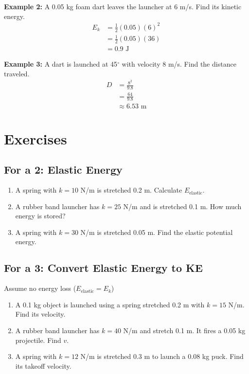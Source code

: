 \documentclass{article}
\begin{document}
\textbf{Example 2:}  
A 0.05 kg foam dart leaves the launcher at 6 m/s.  
Find its kinetic energy.
\begin{align*}
    E_k &= \frac{1}{2}(0.05)(6)^2 \\
        &= \frac{1}{2}(0.05)(36) \\
        &= 0.9 \text{ J}
\end{align*}

\textbf{Example 3:}  
A dart is launched at 45$^\circ$ with velocity 8 m/s.  
Find the distance traveled.
\begin{align*}
    D &= \frac{8^2}{9.8} \\
      &= \frac{64}{9.8} \\
      &\approx 6.53 \text{ m}
\end{align*}

\section{Exercises}

\subsection{For a 2: Elastic Energy}
\begin{enumerate}
    \item A spring with $k = 10$ N/m is stretched 0.2 m. Calculate $E_{\text{elastic}}$.
    \item A rubber band launcher has $k = 25$ N/m and is stretched 0.1 m. How much energy is stored?
    \item A spring with $k = 30$ N/m is stretched 0.05 m. Find the elastic potential energy.
\end{enumerate}

\subsection{For a 3: Convert Elastic Energy to KE}
Assume no energy loss ($E_{\text{elastic}} = E_k$)
\begin{enumerate}
    \item A 0.1 kg object is launched using a spring stretched 0.2 m with $k = 15$ N/m. Find its velocity.
    \item A rubber band launcher has $k = 40$ N/m and stretch 0.1 m. It fires a 0.05 kg projectile. Find $v$.
    \item A spring with $k = 12$ N/m is stretched 0.3 m to launch a 0.08 kg puck. Find its takeoff velocity.
\end{enumerate}
\end{document}
